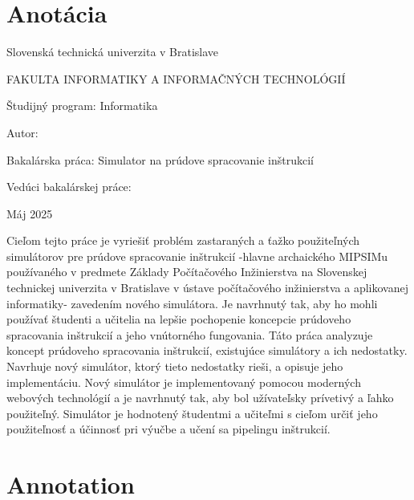\thispagestyle{empty}
\section*{Anotácia}

\begin{minipage}[t]{1\columnwidth}%
Slovenská technická univerzita v Bratislave

FAKULTA INFORMATIKY A INFORMAČNÝCH TECHNOLÓGIÍ

Študijný program: Informatika
\newline

Autor: \myName

Bakalárska práca: Simulator na prúdove spracovanie inštrukcií

Vedúci bakalárskej práce: \mySupervisor

Máj 2025
\end{minipage}

\bigskip{}

Cieľom tejto práce je vyriešiť problém zastaraných a ťažko použiteľných simulátorov pre prúdove spracovanie inštrukcií -hlavne archaického MIPSIMu používaného v predmete Základy Počítačového Inžinierstva na Slovenskej technickej univerzita v Bratislave
v ústave počítačového inžinierstva a aplikovanej informatiky- 
zavedením nového simulátora. Je navrhnutý tak, aby ho mohli používať študenti a učitelia na lepšie pochopenie koncepcie prúdoveho spracovania inštrukcií a jeho vnútorného fungovania. Táto práca analyzuje koncept prúdoveho spracovania inštrukcií, existujúce simulátory a ich nedostatky. Navrhuje nový simulátor, ktorý tieto nedostatky rieši, a opisuje jeho implementáciu. Nový simulátor je implementovaný pomocou moderných webových technológií a je navrhnutý tak, aby bol užívateľsky prívetivý a ľahko použiteľný. Simulátor je hodnotený študentmi a učiteľmi s cieľom určiť jeho použiteľnosť a účinnosť pri výučbe a učení sa pipelingu inštrukcií.




\newpage{}\thispagestyle{empty}

\newpage
\thispagestyle{empty}
\mbox{}
\newpage



\newpage{}\thispagestyle{empty}\medskip{}

\thispagestyle{empty}

\section*{Annotation}

